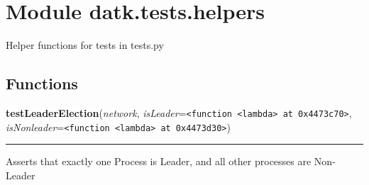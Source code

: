 %
%
%


\section{Module datk.tests.helpers}

    \label{datk:tests:helpers}
Helper functions for tests in tests.py



  \subsection{Functions}

    \label{datk:tests:helpers:testLeaderElection}

    \vspace{0.5ex}

\hspace{.8\funcindent}\begin{boxedminipage}{\funcwidth}

    \raggedright \textbf{testLeaderElection}(\textit{network}, \textit{isLeader}={\tt {\textless}function {\textless}lambda{\textgreater} at 0x4473c70{\textgreater}}, \textit{isNonleader}={\tt {\textless}function {\textless}lambda{\textgreater} at 0x4473d30{\textgreater}})

    \vspace{-1.5ex}

    \rule{\textwidth}{0.5\fboxrule}
\setlength{\parskip}{2ex}
    Asserts that exactly one Process is Leader, and all other processes are
    Non-Leader

\setlength{\parskip}{1ex}
    \end{boxedminipage}

